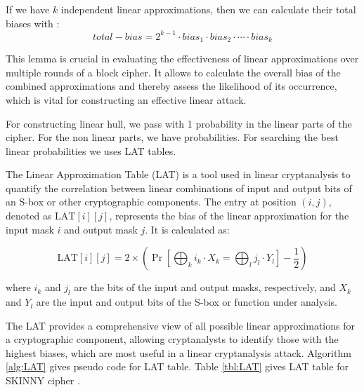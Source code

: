 \begin{definition}
If  we have $k$ independent linear approximations, then we can calculate their total biases with :
\begin{equation}
total-bias = 2^{k-1} \cdot bias_1 \cdot bias_2 \cdot \cdots \cdot bias_k    
\end{equation}

\end{definition}

This lemma is crucial in evaluating the effectiveness of linear approximations over multiple rounds of a block cipher. It allows to calculate the overall bias of the combined approximations and thereby assess the likelihood of its occurrence, which is vital for constructing an effective linear  attack.

For constructing linear hull, we pass with 1 probability in the linear parts of the cipher. For the non linear parts, we have probabilities. For searching the best linear probabilities we uses LAT tables.

\begin{definition}
The Linear Approximation Table (LAT) is a tool used in linear cryptanalysis to quantify the correlation between linear combinations of input and output bits of an S-box or other cryptographic components. The entry at position $(i, j)$, denoted as $\mathrm{LAT}[i][j]$, represents the bias of the linear approximation for the input mask $i$ and output mask $j$. It is calculated as:

\begin{equation}
\mathrm{LAT}[i][j] = 2 \times \left( \Pr \left[ \bigoplus_{k} i_k \cdot X_k = \bigoplus_{l} j_l \cdot Y_l \right] - \frac{1}{2} \right)     
\end{equation}
   

where $i_k$ and $j_l$ are the bits of the input and output masks, respectively, and $X_k$ and $Y_l$ are the input and output bits of the S-box or function under analysis.
    
\end{definition} 

The LAT provides a comprehensive view of all possible linear approximations for a cryptographic component, allowing cryptanalysts to identify those with the highest biases, which are most useful in a linear cryptanalysis attack. Algorithm \ref{alg:LAT} gives pseudo code for LAT table. Table \ref{tbl:LAT} gives LAT table for SKINNY cipher \cite{beierle2016skinny} . 

\begin{algorithm}[H]
    \DontPrintSemicolon
    \caption{Pseudocode for LAT }
    \label{alg:LAT}
\end{algorithm}


